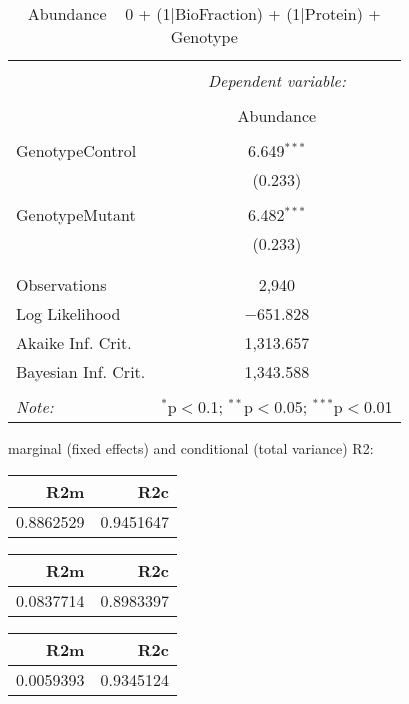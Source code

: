 \documentclass[11pt]{report}
\begin{document}
\begin{table}[!htbp] \centering 
  \caption{Abundance ~ 0 + (1|BioFraction) + (1|Protein) + Genotype} 
  \label{} 
\begin{tabular}{@{\extracolsep{5pt}}lc} 
\\[-1.8ex]\hline 
\hline \\[-1.8ex] 
 & \multicolumn{1}{c}{\textit{Dependent variable:}} \\ 
\cline{2-2} 
\\[-1.8ex] & Abundance \\ 
\hline \\[-1.8ex] 
 GenotypeControl & 6.649$^{***}$ \\ 
  & (0.233) \\ 
  & \\ 
 GenotypeMutant & 6.482$^{***}$ \\ 
  & (0.233) \\ 
  & \\ 
\hline \\[-1.8ex] 
Observations & 2,940 \\ 
Log Likelihood & $-$651.828 \\ 
Akaike Inf. Crit. & 1,313.657 \\ 
Bayesian Inf. Crit. & 1,343.588 \\ 
\hline 
\hline \\[-1.8ex] 
\textit{Note:}  & \multicolumn{1}{r}{$^{*}$p$<$0.1; $^{**}$p$<$0.05; $^{***}$p$<$0.01} \\ 
\end{tabular} 
\end{table} 
marginal (fixed effects) and conditional (total variance) R2:

\begin{tabular}{r|r}
\hline
R2m & R2c\\
\hline
0.8862529 & 0.9451647\\
\hline
\end{tabular}

\begin{tabular}{r|r}
\hline
R2m & R2c\\
\hline
0.0837714 & 0.8983397\\
\hline
\end{tabular}

\begin{tabular}{r|r}
\hline
R2m & R2c\\
\hline
0.0059393 & 0.9345124\\
\hline
\end{tabular}
\end{document}
